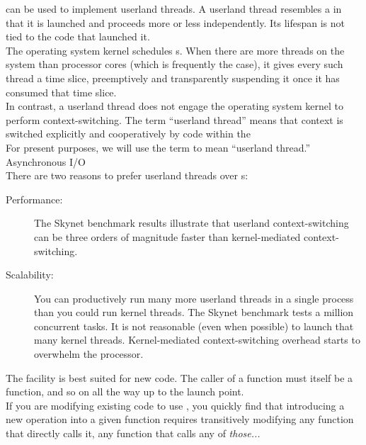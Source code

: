 \newpage
{}
\callcc can be used to implement userland threads. A userland thread resembles
a  in that it is launched and proceeds more or less
independently. Its lifespan is not tied to the code that launched it.\\

The operating system kernel schedules s. When there are more
threads on the system than processor cores (which is frequently the case), it
gives every such thread a time slice, preemptively and transparently
suspending it once it has consumed that time slice.\\

In contrast, a userland thread does not engage the
operating system kernel to perform context-switching. The term ``userland
thread'' means that context is switched explicitly and cooperatively by code within the \\


For present purposes, we will use the term  to mean ``userland
thread.''\\

Asynchronous I/O \\

There are two reasons to prefer userland threads over s:
\begin{description}
  \item[Performance:] The Skynet benchmark results\cite{bfiberperf} illustrate
  that userland context-switching can be three orders of magnitude faster than
  kernel-mediated context-switching.
  \item[Scalability:] You can productively run many more userland threads in a
  single process than you could run kernel threads. The Skynet
  benchmark\cite{bfiberperf} tests a million concurrent tasks. It is not
  reasonable (even when possible) to launch that many kernel threads.
  Kernel-mediated context-switching overhead starts to overwhelm the
  processor.
\end{description}

The \coawait facility is best suited for new code. The caller of
a \coawait function must itself be a \coawait function, and so
on all the way up to the launch point.\\

If you are modifying existing code to use \coawait, you quickly find
that introducing a new \coawait operation into a given function
requires transitively modifying any function that directly calls it, any
function that calls any of \emph{those...}\\

